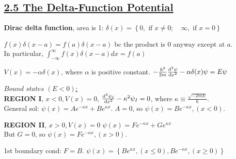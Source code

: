 

\subsection{\underline{2.5 The Delta-Function Potential}}

\textbf{Dirac delta function}, area is 1:
$\delta(x) = \left\{ 0, \textrm { if } x \neq 0; \quad \infty, \textrm{ if } x = 0 \right\}$

$f(x) \delta(x - a) = f(a) \delta(x - a)$ bc the product is 0 anyway except at $a$. \\

In particular, $\int_{-\infty}^{\infty} f(x) \delta(x-a) dx = f(a)$

$V(x) = -\alpha \delta(x)$, where $\alpha$ is positive constant. $-\frac{\hbar^2}{2m} \dv[2]{\psi}{x} - \alpha \delta(x) \psi = E \psi$

\underline{$\textit{Bound states } (E < 0)$:} \\

\textbf{REGION I}, $x < 0, V(x) = 0$, 
$\dv[2]{\psi_{I}}{x} - \kappa^2 \psi_{I} = 0$, where $\kappa \equiv \frac{\sqrt{-2mE}}{\hbar}$. \\

General sol: $\psi(x) = Ae^{-\kappa x} + Be^{\kappa x}$.
$A = 0$, so $\psi(x) = Be^{-\kappa x}, (x < 0)$.

\textbf{REGION II}, $x > 0, V(x) = 0$
$\psi(x) = Fe^{-\kappa x} + Ge^{\kappa x}$ \\
But $G = 0$, so $\psi(x) = Fe^{-\kappa x}, (x > 0)$.

1st boundary cond: $F=B$.
$\psi(x) = \left\{ Be^{\kappa x}, (x \leq 0), Be^{-\kappa x}, (x \geq 0) \right\}$


